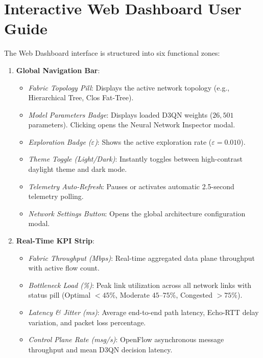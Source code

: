 \section{Interactive Web Dashboard User Guide}
The Web Dashboard interface is structured into six functional zones:
\begin{enumerate}
    \item \textbf{Global Navigation Bar}:
    \begin{itemize}
        \item \textit{Fabric Topology Pill}: Displays the active network topology (e.g., Hierarchical Tree, Clos Fat-Tree).
        \item \textit{Model Parameters Badge}: Displays loaded D3QN weights ($26,501$ parameters). Clicking opens the Neural Network Inspector modal.
        \item \textit{Exploration Badge ($\varepsilon$)}: Shows the active exploration rate ($\varepsilon = 0.010$).
        \item \textit{Theme Toggle (Light/Dark)}: Instantly toggles between high-contrast daylight theme and dark mode.
        \item \textit{Telemetry Auto-Refresh}: Pauses or activates automatic 2.5-second telemetry polling.
        \item \textit{Network Settings Button}: Opens the global architecture configuration modal.
    \end{itemize}
    
    \item \textbf{Real-Time KPI Strip}:
    \begin{itemize}
        \item \textit{Fabric Throughput (Mbps)}: Real-time aggregated data plane throughput with active flow count.
        \item \textit{Bottleneck Load (\%)}: Peak link utilization across all network links with status pill (Optimal $<45\%$, Moderate $45$--$75\%$, Congested $>75\%$).
        \item \textit{Latency \& Jitter (ms)}: Average end-to-end path latency, Echo-RTT delay variation, and packet loss percentage.
        \item \textit{Control Plane Rate (msg/s)}: OpenFlow asynchronous message throughput and mean D3QN decision latency.
    \end{itemize}
    

\end{enumerate}
